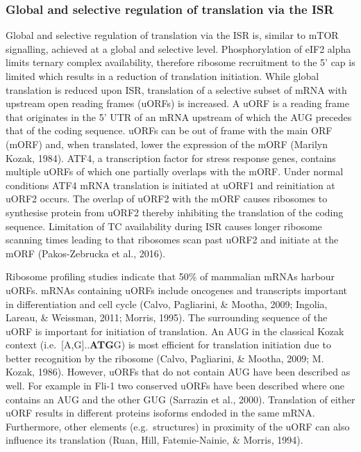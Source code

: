 \documentclass[
  12pt,
  openany]{book}
\begin{document}
\subsubsection{Global and selective regulation of translation via the ISR}

Global and selective regulation of translation via the ISR is, similar to mTOR signalling, achieved at a global and selective level. Phosphorylation of eIF2 alpha limits ternary complex availability, therefore ribosome recruitment to the 5' cap is limited which results in a reduction of translation initiation. While global translation is reduced upon ISR, translation of a selective subset of mRNA with upstream open reading frames (uORFs) is increased. A uORF is a reading frame that originates in the 5' UTR of an mRNA upstream of which the AUG precedes that of the coding sequence. uORFs can be out of frame with the main ORF (mORF) and, when translated, lower the expression of the mORF (Marilyn Kozak, 1984). ATF4, a transcription factor for stress response genes, contains multiple uORFs of which one partially overlaps with the mORF. Under normal conditions ATF4 mRNA translation is initiated at uORF1 and reinitiation at uORF2 occurs. The overlap of uORF2 with the mORF causes ribosomes to synthesise protein from uORF2 thereby inhibiting the translation of the coding sequence. Limitation of TC availability during ISR causes longer ribosome scanning times leading to that ribosomes scan past uORF2 and initiate at the mORF (Pakos-Zebrucka et al., 2016).

Ribosome profiling studies indicate that 50\% of mammalian mRNAs harbour uORFs. mRNAs containing uORFs include oncogenes and transcripts important in differentiation and cell cycle (Calvo, Pagliarini, \& Mootha, 2009; Ingolia, Lareau, \& Weissman, 2011; Morris, 1995). The surrounding sequence of the uORF is important for initiation of translation. An AUG in the classical Kozak context (i.e.~{[}A,G{]}..\textbf{ATG}G) is most efficient for translation initiation due to better recognition by the ribosome (Calvo, Pagliarini, \& Mootha, 2009; M. Kozak, 1986). However, uORFs that do not contain AUG have been described as well. For example in Fli-1 two conserved uORFs have been described where one contains an AUG and the other GUG (Sarrazin et al., 2000). Translation of either uORF results in different proteins isoforms endoded in the same mRNA. Furthermore, other elements (e.g.~structures) in proximity of the uORF can also influence its translation (Ruan, Hill, Fatemie-Nainie, \& Morris, 1994).
\clearpage
\end{document}
